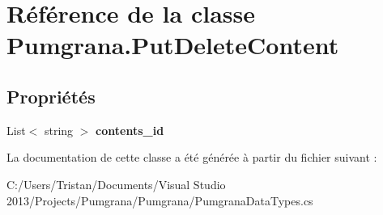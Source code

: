 \hypertarget{class_pumgrana_1_1_put_delete_content}{\section{Référence de la classe Pumgrana.\+Put\+Delete\+Content}
\label{class_pumgrana_1_1_put_delete_content}
}
\subsection*{Propriétés}
\begin{DoxyCompactItemize}
\item 
\hypertarget{class_pumgrana_1_1_put_delete_content_a61f242e2bc4cfdd58303310e5f5dcae6}{List$<$ string $>$ {\bfseries contents\+\_\+id}}\label{class_pumgrana_1_1_put_delete_content_a61f242e2bc4cfdd58303310e5f5dcae6}

\end{DoxyCompactItemize}


La documentation de cette classe a été générée à partir du fichier suivant \+:\begin{DoxyCompactItemize}
\item 
C\+:/\+Users/\+Tristan/\+Documents/\+Visual Studio 2013/\+Projects/\+Pumgrana/\+Pumgrana/Pumgrana\+Data\+Types.\+cs\end{DoxyCompactItemize}
